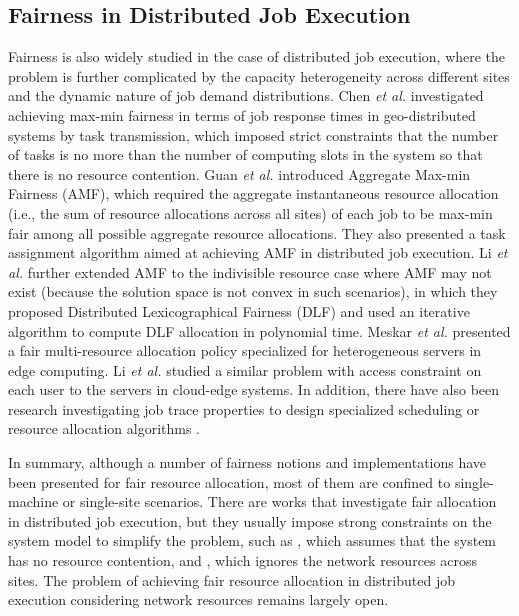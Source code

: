 \subsection{Fairness in Distributed Job Execution}
Fairness is also widely studied in the case of distributed job execution, where the problem is further complicated by the capacity heterogeneity across different sites and the dynamic nature of job demand distributions. Chen \textit{et al.} \cite{chen2018scheduling} investigated achieving max-min fairness in terms of job response times in geo-distributed systems by task transmission, which imposed strict constraints that the number of tasks is no more than the number of computing slots in the system so that there is no resource contention. Guan \textit{et al.} \cite{AMF} introduced Aggregate Max-min Fairness (AMF), which required the aggregate instantaneous resource allocation (i.e., the sum of resource allocations across all sites) of each job to be max-min fair among all possible aggregate resource allocations. They also presented a task assignment algorithm aimed at achieving AMF in distributed job execution. Li \textit{et al.} \cite{li2022towards} further extended AMF to the indivisible resource case where AMF may not exist (because the solution space is not convex in such scenarios), in which they proposed Distributed Lexicographical Fairness (DLF) and used an iterative algorithm to compute DLF allocation in polynomial time. Meskar \textit{et al.} \cite{meskar2022fair} presented a fair multi-resource allocation policy specialized for heterogeneous servers in edge computing. Li \textit{et al.} \cite{li2024fair} studied a similar problem with access constraint on each user to the servers in cloud-edge systems. In addition, there have also been research investigating job trace properties to design specialized scheduling or resource allocation algorithms \cite{tian2019characterizing, luo2021characterizing}.

In summary, although a number of fairness notions and implementations have been presented for fair resource allocation, most of them are confined to single-machine or single-site scenarios. There are works that investigate fair allocation in distributed job execution, but they usually impose strong constraints on the system model to simplify the problem, such as \cite{chen2018scheduling}, which assumes that the system has no resource contention, and \cite{AMF}, which ignores the network resources across sites. The problem of achieving fair resource allocation in distributed job execution considering network resources remains largely open.

